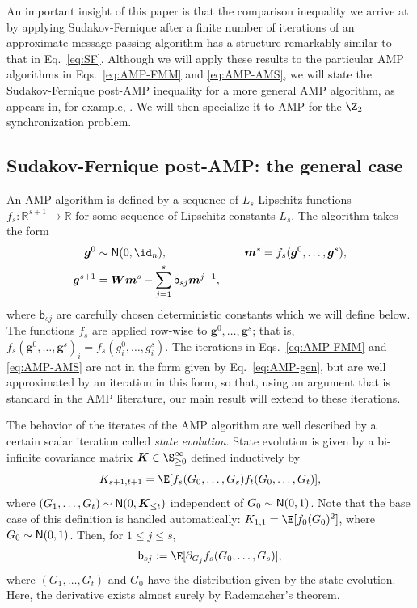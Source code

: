 \documentclass[]{article}
\def\sb{{\mathsf b}}
\def\bW{{\boldsymbol W}}
\def\normal{{\sf N}}
\def\bg{{\boldsymbol g}}
\def\reals{{\mathbb R}}
\def\bW{{\boldsymbol W}}
\def\normal{{\sf N}}
\def\bg{{\boldsymbol g}}
\def\bbm{{\boldsymbol m}}
\def\bK{\boldsymbol{K}}
\begin{document}
An important insight of this paper is that the comparison inequality we arrive at by applying Sudakov-Fernique after a finite number of iterations of an approximate message passing algorithm has a structure remarkably similar to that in Eq.~\eqref{eq:SF}.
Although we will apply these results to the particular AMP algorithms in Eqs.~\eqref{eq:AMP-FMM} and \eqref{eq:AMP-AMS},
we will state the Sudakov-Fernique post-AMP inequality for a more general AMP algorithm,
as appears in, for example, \cite{javanmardMontanari2013}.
We will then specialize it to AMP for the $\Z_2$-synchronization problem.

\subsection{Sudakov-Fernique post-AMP: the general case}

An AMP algorithm is defined by a sequence of $L_s$-Lipschitz functions $f_s : \reals^{s+1} \rightarrow \reals$ for some sequence of Lipschitz constants $L_s$. 
The algorithm takes the form
\begin{equation}
\label{eq:AMP-gen}
\begin{aligned}
    \bg^0 &\sim \normal(0,\id_n),
    \qquad\qquad\qquad&
    \bbm^s &= f_s(\bg^0,\ldots,\bg^s),
    \\
    \bg^{s+1} &= \bW \bbm^s - \sum_{j=1}^s \sb_{sj} \bbm^{j-1},
\end{aligned}
\end{equation}
where $\sb_{sj}$ are carefully chosen deterministic constants which we will define below.
The functions $f_s$ are applied row-wise to $\bg^0,\ldots,\bg^s$;
that is, $f_s(\bg^0,\ldots,\bg^s)_i = f_s(g^0_i,\ldots,g^s_i)$.
The iterations in Eqs.~\eqref{eq:AMP-FMM} and \eqref{eq:AMP-AMS} are not in the form given by Eq.~\eqref{eq:AMP-gen},
but are well approximated by an iteration in this form,  
so that, using an argument that is standard in the AMP literature, our main result will extend to these iterations.

The behavior of the iterates of the AMP algorithm are well described by a certain scalar iteration called \emph{state evolution}.
State evolution is given by a bi-infinite covariance matrix $\bK \in \S^\infty_{\geq0}$
defined inductively by
\begin{equation}
\label{eq:se-gen}
    K_{s+1,t+1} = \E[f_s(G_0,\ldots,G_s)f_t(G_0,\ldots,G_t)],
\end{equation}
where $(G_1,\ldots,G_t) \sim \normal(0,\bK_{\leq t})$ independent of $G_0 \sim \normal(0,1)$.
Note that the base case of this definition is handled automatically: $K_{1,1} = \E[f_0(G_0)^2]$, where $G_0 \sim \normal(0,1)$.
Then, for $1 \leq j \leq s$, 
\begin{equation}
\label{eq:onsag-coef}
    \sb_{sj} := \E[\partial_{G_j} f_s(G_0,\ldots,G_s)],
\end{equation}
where $(G_1,\ldots,G_t)$ and $G_0$ have the distribution given by the state evolution.
Here, the derivative exists almost surely by Rademacher's theorem.
\end{document}
